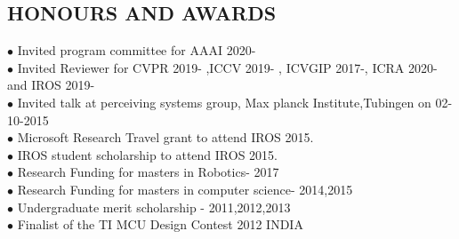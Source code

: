 \documentclass[7pt]{article}
\begin{document}
\begin{small}
\section{HONOURS AND AWARDS}
$\bullet$  Invited program committee for AAAI 2020- \\
$\bullet$  Invited Reviewer for CVPR 2019- ,ICCV 2019- , ICVGIP 2017-, ICRA 2020- and IROS 2019-\\
$\bullet$  Invited talk at perceiving systems group, Max planck Institute,Tubingen on 02-10-2015\\
$\bullet$  Microsoft Research Travel grant to attend IROS 2015.\\
$\bullet$ IROS student scholarship to attend IROS 2015.\\
$\bullet$ Research Funding for masters in Robotics- 2017\\
$\bullet$ Research Funding for masters in computer science- 2014,2015\\
$\bullet$  Undergraduate merit scholarship - 2011,2012,2013\\
$\bullet$  Finalist of the TI MCU Design Contest 2012 INDIA \\



\vspace{-4 mm}

\end{small}
\end{document}
